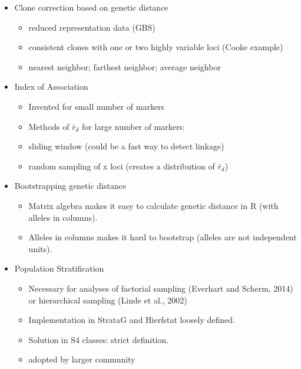 \documentclass{frontiersSCNS} %
\begin{document}
\begin{itemize}
\itemsep1pt\parskip0pt
\item
  Clone correction based on genetic distance

  \begin{itemize}
  \itemsep1pt\parskip0pt
  \item
    reduced representation data (GBS)
  \item
    consistent clones with one or two highly variable loci (Cooke
    example)
  \item
    nearest neighbor; farthest neighbor; average neighbor
  \end{itemize}
\item
  Index of Association

  \begin{itemize}
  \itemsep1pt\parskip0pt
  \item
    Invented for small number of markers
  \item
    Methods of \(\bar{r}_d\) for large number of markers:
  \item
    sliding window (could be a fast way to detect linkage)
  \item
    random sampling of x loci (creates a distribution of \(\bar{r}_d\))
  \end{itemize}
\item
  Bootstrapping genetic distance

  \begin{itemize}
  \itemsep1pt\parskip0pt
  \item
    Matrix algebra makes it easy to calculate genetic distance in R
    (with alleles in columns).
  \item
    Alleles in columns makes it hard to bootstrap (alleles are not
    independent units).
  \end{itemize}
\item
  Population Stratification

  \begin{itemize}
  \itemsep1pt\parskip0pt
  \item
    Necessary for analyses of factorial sampling (Everhart and Scherm,
    2014) or hierarchical sampling (Linde et al., 2002)
  \item
    Implementation in StrataG and Hierfstat loosely defined.
  \item
    Solution in S4 classes: strict definition.
  \item
    adopted by larger community
  \end{itemize}
\end{itemize}
\end{document}
